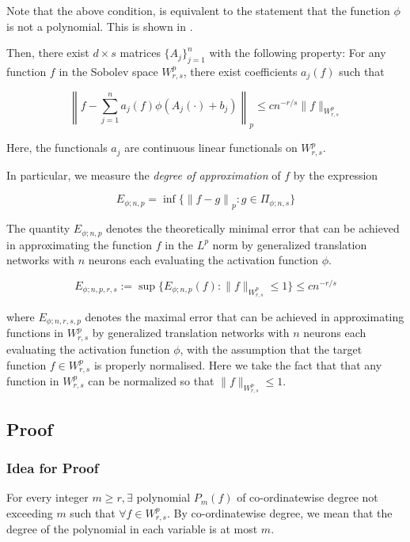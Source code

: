 \documentclass[11pt,a4paper]{article}
\theoremstyle{plain}
\theoremstyle{definition}
\theoremstyle{remark}
\numberwithin{equation}{section}
\begin{document}
Note that the above condition, is equivalent to the statement that the function \(\phi\) is not a polynomial. This is shown in \cite{25Poggio}.

Then, there exist \(d \times s\) matrices \(\{A_j\}_{j=1}^n\) with the following property: For any function \(f\) in the Sobolev space \(W^p_{r,s}\), there exist coefficients \(a_j(f)\) such that

\begin{equation}
    \left\| f - \sum_{j=1}^{n} a_j(f) \phi(A_j(\cdot) + b_{j}) \right\|_p \leq c n^{-r/s} \|f\|_{W^{p}_{r,s}}
\end{equation}

Here, the functionals \(a_j\) are continuous linear functionals on \(W^p_{r,s}\).

In particular, we measure the \textit{degree of approximation} of \(f\) by the expression

   \[
    E_{\phi;n,p} = \inf\{ \left\| f - g \right\|_p : g \in \Pi_{\phi ; n,s} \}
   \]

   The quantity \(E_{\phi ; n,p}\)  denotes the theoretically minimal error that can be achieved in approximating the function \(f\)  in the \(L^p\)  norm by generalized translation networks with \(n\)  neurons each evaluating the activation function \(\phi \).

\[ E_{\phi ; n,p,r,s} := \sup\{E_{\phi ; n,p}(f) : \|f\|_{W^p_{r,s}} \leq 1\}  \leq c n^{-r/s} \]

where \( E_{\phi;n,r,s,p} \) denotes the maximal error that can be achieved in approximating functions in \(W^p_{r,s}\) by generalized translation networks with \(n\) neurons each evaluating the activation function \(\phi \), with the assumption that the target function \(f \in W^p_{r,s}\) is properly normalised. Here we take the fact that that any function in \(W^p_{r,s}\) can be normalized so that \( \|f\|_{W^p_{r,s}} \leq 1 \).

\subsection{Proof} 

\subsubsection{Idea for Proof}

For every integer \(m \geq r, \exists \) polynomial \(P_{m}(f)\) of co-ordinatewise degree not exceeding \(m\) such that \(\forall f \in W^{p}_{r,s}\).
By co-ordinatewise degree, we mean that the degree of the polynomial in each variable is at most \(m\).
\end{document}
